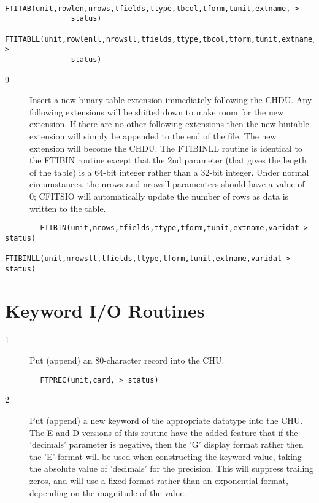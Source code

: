 \documentclass[11pt]{book}
\begin{document}
\begin{verbatim}
        FTITAB(unit,rowlen,nrows,tfields,ttype,tbcol,tform,tunit,extname, >
               status)
        FTITABLL(unit,rowlenll,nrowsll,tfields,ttype,tbcol,tform,tunit,extname, >
               status)
\end{verbatim}

\begin{description}
\item[9 ] Insert a new binary table extension immediately following the CHDU.
    Any following extensions will be shifted down to make room for
    the new extension.  If there are no other following extensions
    then the new bintable extension will simply be appended to the
     end of the file.  The new extension will become the CHDU. The FTIBINLL
    routine is identical
    to the FTIBIN routine except that the 2nd parameter (that gives
    the length of the table) is a 64-bit integer rather than
    a 32-bit integer. Under normal circumstances, the nrows and nrowsll
    paramenters should have a value of 0; CFITSIO will automatically update
   the number of rows as data is written to the table.
\end{description}

\begin{verbatim}
        FTIBIN(unit,nrows,tfields,ttype,tform,tunit,extname,varidat > status)
        FTIBINLL(unit,nrowsll,tfields,ttype,tform,tunit,extname,varidat > status)

\end{verbatim}

\section{Keyword I/O Routines}


\begin{description}
\item[1 ]Put (append) an 80-character record into the CHU.
\end{description}

\begin{verbatim}
        FTPREC(unit,card, > status)
\end{verbatim}

\begin{description}
\item[2 ] Put (append) a new keyword of the appropriate datatype into the CHU.
     The E and D versions of this routine have the added feature that
     if the 'decimals' parameter is negative, then the 'G' display
     format rather then the 'E' format will be used when constructing
     the keyword value, taking the absolute value of 'decimals' for the
     precision.  This will suppress trailing zeros, and will use a
     fixed format rather than an exponential format,
    depending on the magnitude of the value.
\end{description}
\end{document}
